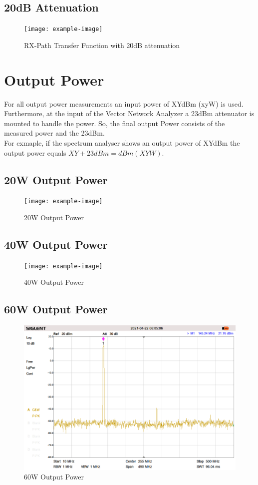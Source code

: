 \subsection{20dB Attenuation}
	\begin{figure}[ht!]
		\centering
		\texttt{[image: example-image]}
		\caption{RX-Path Transfer Function with 20dB attenuation}
		\label{fig:20dB Att}
	\end{figure}
	\newpage
	
\section{Output Power}
For all output power measurements an input power of XYdBm (xyW) is used.
Furthermore, at the input of the Vector Network Analyzer a 23dBm attenuator is mounted to handle the power.
So, the final output Power consists of the measured power and the 23dBm.\\
For exmaple, if the spectrum analyser shows an output power of XYdBm the output power equals $XY+23dBm = dBm (XYW)$.

\subsection{20W Output Power} 
	\begin{figure}[ht!]
		\centering
		\texttt{[image: example-image]}
		\caption{20W Output Power}
		\label{fig:20W OUT}
	\end{figure}
	\newpage

\subsection{40W Output Power}
	\begin{figure}[ht!]
		\centering
		\texttt{[image: example-image]}
		\caption{40W Output Power}
		\label{fig:40W OUT}
	\end{figure}

\subsection{60W Output Power}
	\begin{figure}[ht!]
		\centering
		\includegraphics[width = 12cm]{./5_measurements/fig/60W-Out}
		\caption{60W Output Power}
		\label{fig:60W OUT}
	\end{figure}